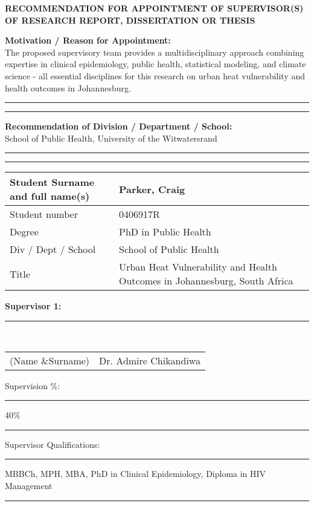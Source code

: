 \documentclass[12pt,a4paper]{article}
\newcommand{\formline}{\rule{\linewidth}{0.4pt}}
\begin{document}
\pagestyle{empty}

\begin{center}
    \Large\textbf{RECOMMENDATION FOR APPOINTMENT OF SUPERVISOR(S) OF RESEARCH REPORT, DISSERTATION OR THESIS}
\end{center}

\vspace{0.5cm}
\textbf{Motivation / Reason for Appointment:} \\
The proposed supervisory team provides a multidisciplinary approach combining expertise in clinical epidemiology, public health, statistical modeling, and climate science - all essential disciplines for this research on urban heat vulnerability and health outcomes in Johannesburg. \\
\formline
\formline

\vspace{0.5cm}
\textbf{Recommendation of Division / Department / School:} \\
School of Public Health, University of the Witwatersrand\\
\formline
\formline

\vspace{0.5cm}
\begin{tabular}{|p{4cm}|p{12cm}|}
\hline
Student Surname and full name(s) & Parker, Craig \\ \hline
Student number & 0406917R \\ \hline
Degree & PhD in Public Health \\ \hline
Div / Dept / School & School of Public Health \\ \hline
Title & Urban Heat Vulnerability and Health Outcomes in Johannesburg, South Africa \\ \hline
\end{tabular}

\vspace{1cm}
\textbf{Supervisor 1:} \rule{12cm}{0.4pt} \\
\begin{tabular}{ll}
(Name \&Surname) & Dr. Admire Chikandiwa \\
\end{tabular}

\vspace{0.3cm}
Supervision \%: \rule{3cm}{0.4pt} 40\% \rule{10cm}{0.4pt}

\vspace{0.3cm}
Supervisor Qualifications: \rule{12cm}{0.4pt} MBBCh, MPH, MBA, PhD in Clinical Epidemiology, Diploma in HIV Management \rule{12cm}{0.4pt}
\end{document}
